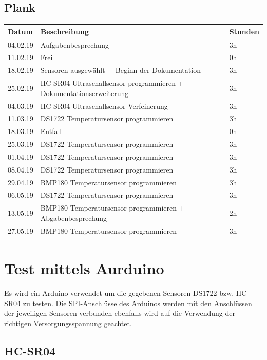\documentclass[12pt,a4paper,german]{article}
\begin{document}
\subsection{Plank}
\begin{table}[H]
\centering 
\begin{tabularx}{\textwidth}{|l|X|l|}
\hline
\textbf{Datum} & \textbf{Beschreibung} & \textbf{Stunden} \\ 
\hline
\hline
04.02.19 & Aufgabenbesprechung & 3h \\ 
\hline
11.02.19 & Frei & 0h \\ 
\hline
18.02.19 & Sensoren ausgewählt + Beginn der Dokumentation & 3h \\ 
\hline
25.02.19 & HC-SR04 Ultraschallsensor programmieren + Dokumentationserweiterung & 3h \\ 
\hline
04.03.19 & HC-SR04 Ultraschallsensor Verfeinerung& 3h \\ 
\hline
11.03.19 & DS1722 Temperatursensor programmieren & 3h \\ 
\hline
18.03.19 & Entfall & 0h\\ 
\hline
25.03.19 & DS1722 Temperatursensor programmieren & 3h \\ 
\hline
01.04.19 & DS1722 Temperatursensor programmieren & 3h \\ 
\hline
08.04.19 & DS1722 Temperatursensor programmieren & 3h \\ 
\hline
29.04.19 & BMP180 Temperatursensor programmieren & 3h \\ 
\hline
06.05.19 & DS1722 Temperatursensor programmieren & 3h \\
\hline
13.05.19 & BMP180 Temperatursensor programmieren + Abgabenbesprechung & 2h \\ 
\hline
27.05.19 & BMP180 Temperatursensor programmieren &3h \\ 
\hline
\end{tabularx}
\end{table}


\section{Test mittels Aurduino}

Es wird ein Arduino verwendet um die gegebenen Sensoren DS1722 bzw. HC-SR04 zu 
testen. Die SPI-Anschlüsse des Arduinos werden mit den Anschlüssen der
jeweiligen Sensoren verbunden ebenfalls wird auf die Verwendung der richtigen Versorgungsspannung geachtet.

\newpage
\subsection{HC-SR04}
\end{document}
